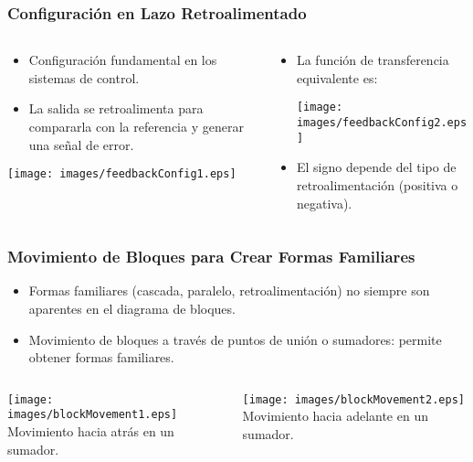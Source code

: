 \documentclass[aspectratio=169,handout]{beamer}
\theoremstyle{definition}
\theoremstyle{plain}
\theoremstyle{remark}
\begin{document}
\begin{frame}[<+->]\frametitle{Configuración en Lazo Retroalimentado}
	\begin{columns}
		\begin{column}{0.5\textwidth}
		\begin{itemize}
			\item Configuración fundamental en los sistemas de control.
			\item La salida se retroalimenta para compararla con la referencia y generar una señal de error.
		\end{itemize}
		\begin{center}
			\texttt{[image: images/feedbackConfig1.eps]}
		\end{center}
		\end{column}
		\begin{column}{0.5\textwidth}
		\begin{itemize}
			\item La función de transferencia equivalente es:
			\begin{center}
				\texttt{[image: images/feedbackConfig2.eps]}
			\end{center}
		\item El signo depende del tipo de retroalimentación (positiva o negativa).
		\end{itemize}
		\end{column}
	\end{columns}
\end{frame}

\begin{frame}[<+->]\frametitle{Movimiento de Bloques para Crear Formas Familiares}
	\begin{itemize}
		\item Formas familiares (cascada, paralelo, retroalimentación) no siempre son aparentes en el diagrama de bloques.
		\item Movimiento de bloques a través de puntos de unión o sumadores: permite obtener formas familiares.
	\end{itemize}
	\begin{columns}
		\begin{column}{0.5\textwidth}
			\centering
			\texttt{[image: images/blockMovement1.eps]}
			\small Movimiento hacia atrás en un sumador.
		\end{column}	
		\pause
		\begin{column}{0.5\textwidth}
			\centering
			\texttt{[image: images/blockMovement2.eps]}
			\small Movimiento hacia adelante en un sumador.
		\end{column}	
	\end{columns}
\end{frame}
\end{document}
